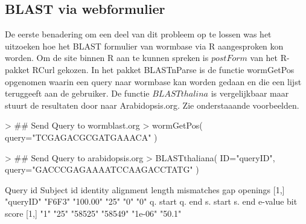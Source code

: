 \documentclass[a4paper]{article}
\begin{document}
\subsection*{BLAST via webformulier}
De eerste benadering om een deel van dit probleem op te lossen was het uitzoeken hoe het BLAST formulier van wormbase\cite{Wormbase} via R aangesproken kon worden. Om de site binnen R aan te kunnen spreken is $postForm$ van het R-pakket RCurl\cite{RCurl} gekozen. In het pakket BLASTnParse is de functie wormGetPos opgenomen waarin een query naar wormbase kan worden gedaan en die een lijst teruggeeft aan de gebruiker. De functie $BLASTthalina$ is vergelijkbaar maar stuurt de resultaten door naar Arabidopsis.org\cite{Arab}. Zie onderstaaande voorbeelden.
\begin{Schunk}
\begin{Sinput}
> ## Send Query to wormblast.org
> wormGetPos( query="TCGAGACGCGATGAAACA" )
\end{Sinput}
\begin{Sinput}
> ## Send Query to arabidopsis.org
> BLASTthaliana( ID="queryID", query="GACCCGAGAAAATCCAAGACCTATG" )
\end{Sinput}
\begin{Soutput}
     Query id  Subject id identity alignment length mismatches gap openings
[1,] "queryID" "F6F3"     "100.00" "25"             "0"        "0"         
     q. start q. end s. start s. end  e-value bit score
[1,] "1"      "25"   "58525"  "58549" "1e-06" "50.1"   
\end{Soutput}
\end{Schunk}
\end{document}
